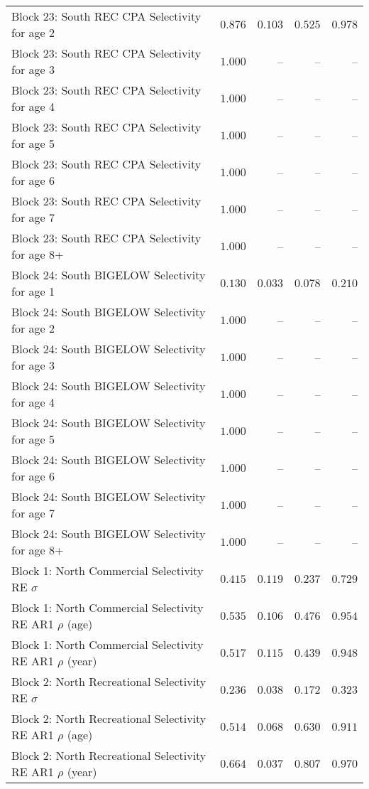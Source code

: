 \documentclass[
]{article}
\begin{document}
\begin{landscape}
\begin{longtable}[t]{lrrrr}
Block 23: South REC CPA Selectivity for age 2 & $0.876$ & $0.103$ & $0.525$ & $0.978$\\
\addlinespace
Block 23: South REC CPA Selectivity for age 3 & $1.000$ & -- & -- & --\\
Block 23: South REC CPA Selectivity for age 4 & $1.000$ & -- & -- & --\\
Block 23: South REC CPA Selectivity for age 5 & $1.000$ & -- & -- & --\\
Block 23: South REC CPA Selectivity for age 6 & $1.000$ & -- & -- & --\\
Block 23: South REC CPA Selectivity for age 7 & $1.000$ & -- & -- & --\\
\addlinespace
Block 23: South REC CPA Selectivity for age 8+ & $1.000$ & -- & -- & --\\
Block 24: South BIGELOW Selectivity for age 1 & $0.130$ & $0.033$ & $0.078$ & $0.210$\\
Block 24: South BIGELOW Selectivity for age 2 & $1.000$ & -- & -- & --\\
Block 24: South BIGELOW Selectivity for age 3 & $1.000$ & -- & -- & --\\
Block 24: South BIGELOW Selectivity for age 4 & $1.000$ & -- & -- & --\\
\addlinespace
Block 24: South BIGELOW Selectivity for age 5 & $1.000$ & -- & -- & --\\
Block 24: South BIGELOW Selectivity for age 6 & $1.000$ & -- & -- & --\\
Block 24: South BIGELOW Selectivity for age 7 & $1.000$ & -- & -- & --\\
Block 24: South BIGELOW Selectivity for age 8+ & $1.000$ & -- & -- & --\\
Block 1: North Commercial Selectivity RE $\sigma$ & $0.415$ & $0.119$ & $0.237$ & $0.729$\\
\addlinespace
Block 1: North Commercial Selectivity RE AR1 $\rho$ (age) & $0.535$ & $0.106$ & $0.476$ & $0.954$\\
Block 1: North Commercial Selectivity RE AR1 $\rho$ (year) & $0.517$ & $0.115$ & $0.439$ & $0.948$\\
Block 2: North Recreational Selectivity RE $\sigma$ & $0.236$ & $0.038$ & $0.172$ & $0.323$\\
Block 2: North Recreational Selectivity RE AR1 $\rho$ (age) & $0.514$ & $0.068$ & $0.630$ & $0.911$\\
Block 2: North Recreational Selectivity RE AR1 $\rho$ (year) & $0.664$ & $0.037$ & $0.807$ & $0.970$\\

\end{longtable}
\end{landscape}
\end{document}
